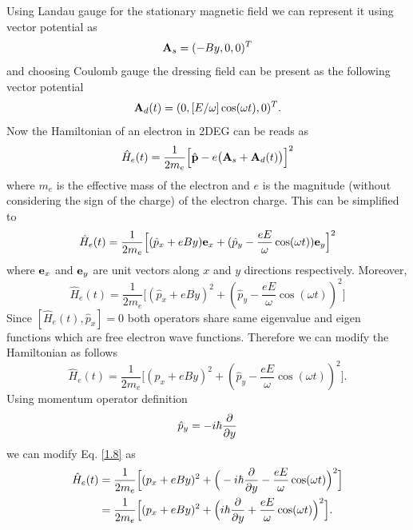 \documentclass[a4paper]{article}
\numberwithin{equation}{subsection}
\numberwithin{equation}{section}
\begin{document}
\noindent
Using Landau gauge for the stationary magnetic field we can represent it using vector potential as
\begin{equation} \label{1.3}
  \vb{A}_{s} = (-By,0,0)^T
\end{equation}
and choosing Coulomb gauge the dressing field can be present as the following vector potential
\begin{equation} \label{1.4}
  \vb{A}_{d}(t) = (0,[E/\omega ]\cos(\omega t),0)^T.
\end{equation}
Now the Hamiltonian of an electron in 2DEG can be reads as
\begin{equation} \label{1.5}
  \hat{H}_e(t) = \frac{1}{2m_e}\Big[\hat{\vb{p}} - e\big(\vb{A}_{s}+\vb{A}_{d}(t)\big)\Big]^2
\end{equation}
where $m_e$ is the effective mass of the electron and $e$ is the magnitude (without considering the sign of the charge) of the electron charge. This can be simplified to
\begin{equation} \label{1.6}
  \hat{H}_e(t) = \frac{1}{2m_e}\Big[
    (\hat{p}_x + eBy)\vb{e}_x +
    (\hat{p}_y - \frac{eE}{\omega}\cos(\omega t))\vb{e}_y
  \Big]^2
\end{equation}
where $\vb{e}_x$ and $\vb{e}_y$ are unit vectors along $x$ and $y$ directions respectively. Moreover,
\begin{equation} \label{1.7}
  \hat{H}_e(t) = \frac{1}{2m_e}\Big[
    (\hat{p}_x + eBy)^2 +
    (\hat{p}_y - \frac{eE}{\omega}\cos(\omega t))^2
  \Big]
\end{equation}
Since $[\hat{H}_e(t),\hat{p}_x] =0$ both operators share same eigenvalue and eigen functions which are free electron wave functions. Therefore we can modify the Hamiltonian as follows
\begin{equation} \label{1.8}
  \hat{H}_e(t) = \frac{1}{2m_e}\Big[
    ({p}_x + eBy)^2 +
    (\hat{p}_y - \frac{eE}{\omega}\cos(\omega t))^2
  \Big].
\end{equation}
Using momentum operator definition
\begin{equation} \label{1.9}
  \hat{p}_y = -i\hbar \pdv{y}
\end{equation}
we can modify Eq. \eqref{1.8} as
\begin{equation} \label{1.10}
  \begin{aligned}
    \hat{H}_e(t) & = \frac{1}{2m_e}\Big[
      ({p}_x + eBy)^2 +
      \Big(-i\hbar \pdv{y}- \frac{eE}{\omega}\cos(\omega t)\Big)^2
    \Big] \\
    & = \frac{1}{2m_e}\Big[
      ({p}_x + eBy)^2 +
      \Big(i\hbar \pdv{y} + \frac{eE}{\omega}\cos(\omega t)\Big)^2
    \Big].
  \end{aligned}
\end{equation}
\end{document}
